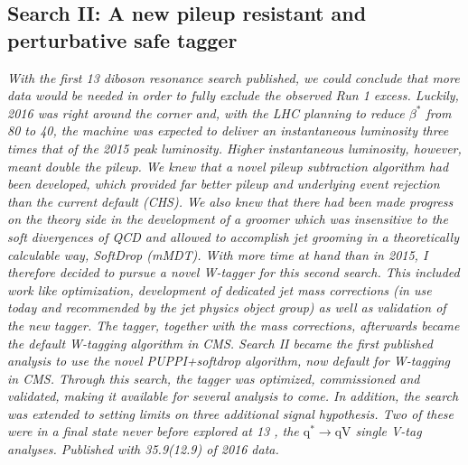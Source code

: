 \vspace*{\fill}
\begin{centering}
\section{Search II: A new pileup resistant and perturbative safe tagger}
\label{searchII}
\textit{
With the first 13 \TeV diboson resonance search published, we could conclude that more data would be needed in order to fully exclude the observed Run 1 excess. Luckily, 2016 was right around the corner and, with the LHC planning to reduce $\beta^*$ from 80 \cm to 40, the machine was expected to deliver an instantaneous luminosity three times that of the 2015 peak luminosity. Higher instantaneous luminosity, however, meant double the pileup.
\newline
\newline
We knew that a novel pileup subtraction algorithm had been developed, which provided far better pileup and underlying event rejection than the current default (CHS). We also knew that there had been made progress on the theory side in the development of a groomer which was insensitive to the soft divergences of QCD and allowed to accomplish jet grooming in a theoretically calculable way, SoftDrop (mMDT). With more time at hand than in 2015, I therefore decided to pursue a novel W-tagger for this second search. This included work like optimization, development of dedicated jet mass corrections (in use today and recommended by the jet physics object group) as well as validation of the new tagger. The tagger, together with the mass corrections, afterwards became the default W-tagging algorithm in CMS.
\newline
\newline
Search II became the first published analysis to use the novel PUPPI+softdrop algorithm, now default for W-tagging in CMS. Through this search, the tagger was optimized, commissioned and validated, making it available for several analysis to come. In addition, the search was extended to setting limits on three additional signal hypothesis. Two of these were in a final state never before explored at 13 \TeV, the $\textrm{q}^* \rightarrow \textrm{qV}$ single V-tag analyses. Published with 35.9(12.9) \fbinv of 2016 data.
}
\end{centering}
